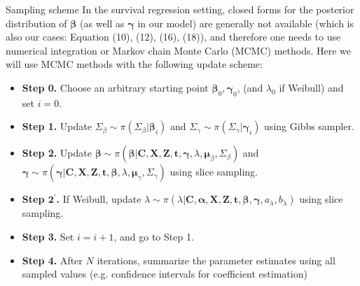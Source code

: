 \documentclass[a4paper, 12pt]{article}
\makeatletter
\renewcommand{\subsection}{\@startsection
	{subsection}    {2}    {0mm}    {-0.5\baselineskip}    {0.01\baselineskip}    {\normalfont\normalsize\itshape\center}}
\makeatother
\begin{document}
\subsection{Sampling scheme}
\noindent In the survival regression setting, closed forms for the posterior
distribution of $\mathbf{\beta}$ (as well as $\mathbf{\gamma}$ in our model) are generally not available (which is also our cases: Equation (10), (12), (16), (18)), and therefore one needs to use numerical integration or Markov chain Monte Carlo (MCMC) methods. Here we will use MCMC methods with the following update scheme:
\begin{itemize}
	\item[] {\textbf{Step 0.}} Choose an arbitrary starting point $\mathbf{\beta}_0, \mathbf{\gamma}_0$, (and $\lambda_0$ if Weibull) and set $i = 0$.
	\item[] {\textbf{Step 1.}} Update $\Sigma_{\beta} \sim \pi(\Sigma_{\beta}|\mathbf{\beta}_i)$ and $\Sigma_{\gamma} \sim \pi(\Sigma_{\gamma}|\mathbf{\gamma}_i)$ using Gibbs sampler.
	\item[] {\textbf{Step 2.}} Update $\mathbf{\beta}\sim \pi(\mathbf{\beta}|\mathbf{C}, \mathbf{X}, \mathbf{Z}, \mathbf{t}, \mathbf{\gamma}, \lambda, \mathbf{\mu}_{\beta}, \Sigma_{\beta})$ and $\mathbf{\gamma}\sim \pi(\mathbf{\gamma}|\mathbf{C}, \mathbf{X}, \mathbf{Z}, \mathbf{t}, \mathbf{\beta}, \lambda, \mathbf{\mu}_{\gamma}, \Sigma_{\gamma})$ using slice sampling. 
		\item[] {\textbf{Step $\mathbf{2}^\prime$.}} If Weibull, update $\lambda \sim \pi(\lambda|\mathbf{C}, \mathbf{\alpha}, \mathbf{X}, \mathbf{Z}, \mathbf{t}, \mathbf{\beta}, \mathbf{\gamma}, a_{\lambda}, b_{\lambda})$  using slice sampling.
	\item[] {\textbf{Step 3.}} Set $i = i + 1$, and go to Step 1.
	\item[] {\textbf{Step 4.}} After $N$ iterations, summarize the parameter estimates using all sampled values (e.g. confidence intervals for coefficient estimation)
\end{itemize}
\end{document}
